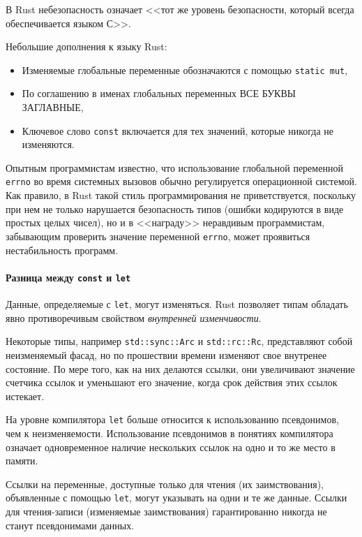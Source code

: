 \documentclass[%
	11pt,
	a4paper,
	utf8,
		]{article}
\begin{document}
В Rust небезопасность означает <<тот же уровень безопасности, который всегда обеспечивается языком С>>.

Небольшие дополнения к языку Rust:
\begin{itemize}
	\item Изменяемые глобальные переменные обозначаются с помощью \verb|static mut|,
	
	\item По соглашению в именах глобальных переменных ВСЕ БУКВЫ ЗАГЛАВНЫЕ,
	
	\item Ключевое слово \texttt{const} включается для тех значений, которые никогда не изменяются.
\end{itemize}

Опытным программистам известно, что использование глобальной переменной \texttt{errno} во время системных вызовов обычно регулируется операционной системой. Как правило, в Rust такой стиль программирования не приветствуется, поскольку при нем не только нарушается безопасность типов (ошибки кодируются в виде простых целых чисел), но и в <<награду>> неравдивым программистам, забывающим проверить значение переменной \texttt{errno}, может проявиться нестабильность программ.

\paragraph{Разница между \texttt{const} и \texttt{let}} Данные, определяемые с \texttt{let}, могут изменяться. Rust позволяет типам обладать явно противоречивым свойством \emph{внутренней изменчивости}.

Некоторые типы, например \verb|std::sync::Arc| и \verb|std::rc::Rc|, представляют собой неизменяемый фасад, но по прошествии времени изменяют свое внутренее состояние. По мере того, как на них делаются ссылки, они увеличивают значение счетчика ссылок и уменьшают его значение, когда срок действия этих ссылок истекает.

На уровне компилятора \texttt{let} больше относится к использованию псевдонимов, чем к неизменяемости. Использование псевдонимов в понятиях компилятора означает одновременное наличие нескольких ссылок на одно и то же место в памяти.

Ссылки на переменные, доступные только для чтения (их заимствования), объявленные с помощью \texttt{let}, могут указывать на одни и те же данные. Ссылки для чтения-записи (изменяемые заимствования) гарантированно никогда не станут псевдонимами данных.
\end{document}
